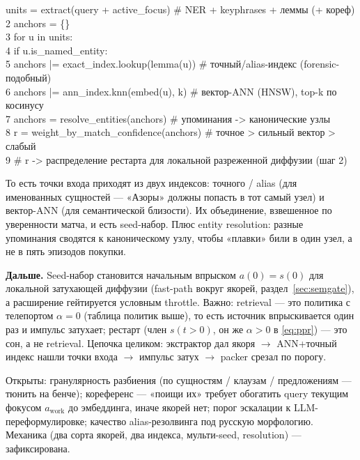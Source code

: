 \begin{flushleft} units      = extract(query + active\_focus)      \# NER + keyphrases + леммы (+ кореф)\\
2 anchors    = \{\}\\
3 for u in units:\\
4 \quad if u.is\_named\_entity:\\
5 \qquad anchors |= exact\_index.lookup(lemma(u)) \# точный/alias-индекс (forensic-подобный)\\
6 \quad anchors |= ann\_index.knn(embed(u), k)     \# вектор-ANN (HNSW), top-k по косинусу\\
7 anchors    = resolve\_entities(anchors)          \# упоминания -> канонические узлы\\
8 r          = weight\_by\_match\_confidence(anchors) \# точное > сильный вектор > слабый\\
9 \# r -> распределение рестарта для локальной разреженной диффузии (шаг 2)
\end{flushleft}

То есть точки входа приходят из двух индексов: точного / alias (для именованных
сущностей --- «Азоры» должны попасть в тот самый узел) и вектор-ANN (для
семантической близости). Их объединение, взвешенное по уверенности матча, и
есть seed-набор. Плюс entity resolution: разные упоминания сводятся к
каноническому узлу, чтобы «плавки» били в один узел, а не в пять эпизодов
покупки.

\smallskip\noindent\textbf{Дальше.}
Seed-набор становится начальным впрыском $a(0)=s(0)$ для локальной затухающей
диффузии (fast-path вокруг якорей, раздел~\ref{sec:semgate}), а расширение
гейтируется условным throttle. Важно: retrieval --- это политика с телепортом
$\alpha = 0$ (таблица политик выше), то есть источник впрыскивается один раз и
импульс затухает; рестарт (член $s(t>0)$, он же $\alpha>0$ в \eqref{eq:ppr}) ---
это сон, а не retrieval. Цепочка целиком: экстрактор дал якоря $\to$
ANN+точный индекс нашли точки входа $\to$ импульс затух $\to$ packer срезал по
порогу.

\begin{openq}
Открыты: гранулярность разбиения (по сущностям / клаузам / предложениям ---
тюнить на бенче); кореференс --- «поищи их» требует обогатить query текущим
фокусом $a_{\text{work}}$ до эмбеддинга, иначе якорей нет; порог эскалации к
LLM-переформулировке; качество alias-резолвинга под русскую морфологию.
Механика (два сорта якорей, два индекса, мульти-seed, resolution) ---
зафиксирована.
\end{openq}


